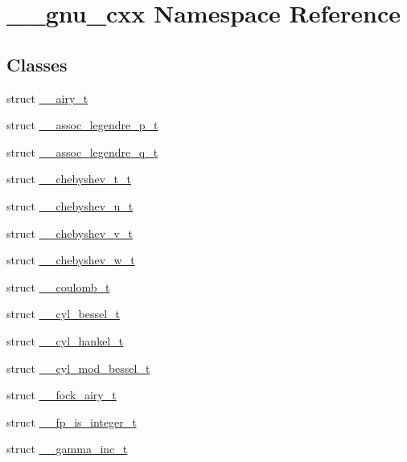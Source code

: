\hypertarget{namespace____gnu__cxx}{}\section{\+\_\+\+\_\+gnu\+\_\+cxx Namespace Reference}
\label{namespace____gnu__cxx}
\subsection*{Classes}
\begin{DoxyCompactItemize}
\item 
struct \hyperlink{struct____gnu__cxx_1_1____airy__t}{\+\_\+\+\_\+airy\+\_\+t}
\item 
struct \hyperlink{struct____gnu__cxx_1_1____assoc__legendre__p__t}{\+\_\+\+\_\+assoc\+\_\+legendre\+\_\+p\+\_\+t}
\item 
struct \hyperlink{struct____gnu__cxx_1_1____assoc__legendre__q__t}{\+\_\+\+\_\+assoc\+\_\+legendre\+\_\+q\+\_\+t}
\item 
struct \hyperlink{struct____gnu__cxx_1_1____chebyshev__t__t}{\+\_\+\+\_\+chebyshev\+\_\+t\+\_\+t}
\item 
struct \hyperlink{struct____gnu__cxx_1_1____chebyshev__u__t}{\+\_\+\+\_\+chebyshev\+\_\+u\+\_\+t}
\item 
struct \hyperlink{struct____gnu__cxx_1_1____chebyshev__v__t}{\+\_\+\+\_\+chebyshev\+\_\+v\+\_\+t}
\item 
struct \hyperlink{struct____gnu__cxx_1_1____chebyshev__w__t}{\+\_\+\+\_\+chebyshev\+\_\+w\+\_\+t}
\item 
struct \hyperlink{struct____gnu__cxx_1_1____coulomb__t}{\+\_\+\+\_\+coulomb\+\_\+t}
\item 
struct \hyperlink{struct____gnu__cxx_1_1____cyl__bessel__t}{\+\_\+\+\_\+cyl\+\_\+bessel\+\_\+t}
\item 
struct \hyperlink{struct____gnu__cxx_1_1____cyl__hankel__t}{\+\_\+\+\_\+cyl\+\_\+hankel\+\_\+t}
\item 
struct \hyperlink{struct____gnu__cxx_1_1____cyl__mod__bessel__t}{\+\_\+\+\_\+cyl\+\_\+mod\+\_\+bessel\+\_\+t}
\item 
struct \hyperlink{struct____gnu__cxx_1_1____fock__airy__t}{\+\_\+\+\_\+fock\+\_\+airy\+\_\+t}
\item 
struct \hyperlink{struct____gnu__cxx_1_1____fp__is__integer__t}{\+\_\+\+\_\+fp\+\_\+is\+\_\+integer\+\_\+t}
\item 
struct \hyperlink{struct____gnu__cxx_1_1____gamma__inc__t}{\+\_\+\+\_\+gamma\+\_\+inc\+\_\+t}

\end{DoxyCompactItemize}
